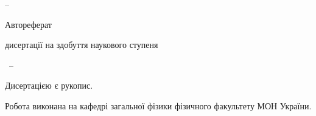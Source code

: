 \vspace{0pt plus1.5fill} %
\begin{center}
\textbf { \MakeUppercase
\thesisTitle}

\vspace{0pt plus1.5fill} %
{\large \thesisSpecialtyNumber -- \thesisSpecialtyTitle}

\vspace{0pt plus3.0fill} %
\Large{Автореферат}\par
\large{дисертації на здобуття наукового ступеня\par \thesisDegree}
\end{center}

\vspace{0pt plus4fill} %
{\centering\thesisCity~-- \thesisYear\par}

\newpage
\thispagestyle{empty}
\noindent Дисертацією є рукопис.
\vspace{0.008\paperheight plus1fill}

\noindent Робота виконана на кафедрі загальної фізики фізичного факультету {\thesisOfOrganization} МОН України.

